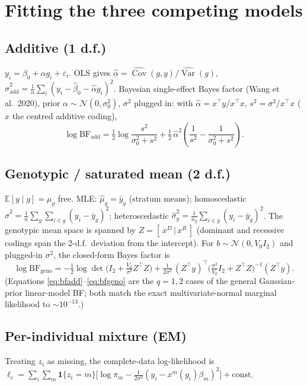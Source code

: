 \documentclass[11pt]{article}
\newcommand{\E}{\mathbb{E}}
\newcommand{\N}{\mathcal{N}}
\newcommand{\Var}{\operatorname{Var}}
\newcommand{\Cov}{\operatorname{Cov}}
\begin{document}
\section{Fitting the three competing models}

\subsection{Additive (1 d.f.)}
$y_i=\beta_0+\alpha g_i+\varepsilon_i$. OLS gives
$\hat\alpha=\widehat{\Cov}(g,y)/\widehat{\Var}(g)$,
$\hat\sigma^2_{\mathrm{add}}=\tfrac1n\sum_i(y_i-\hat\beta_0-\hat\alpha g_i)^2$.
Bayesian single-effect Bayes factor (Wang et al.\ 2020), prior
$\alpha\sim\N(0,\sigma_0^2)$, $\sigma^2$ plugged in: with $\hat\alpha=x^\top y/x^\top x$,
$s^2=\sigma^2/x^\top x$ ($x$ the centred additive coding),
\begin{equation}
\log\mathrm{BF}_{\mathrm{add}}
=\tfrac12\log\frac{s^2}{\sigma_0^2+s^2}
+\tfrac12\,\hat\alpha^2\!\left(\frac1{s^2}-\frac1{\sigma_0^2+s^2}\right).
\label{eq:bfadd}
\end{equation}

\subsection{Genotypic / saturated mean (2 d.f.)}
$\E[y\mid g]=\mu_g$ free. MLE: $\hat\mu_g=\bar y_g$ (stratum means);
homoscedastic $\hat\sigma^2=\tfrac1n\sum_g\sum_{i\in g}(y_i-\bar y_g)^2$;
heteroscedastic $\hat\sigma_g^2=\tfrac1{n_g}\sum_{i\in g}(y_i-\bar y_g)^2$.
The genotypic mean space is spanned by $Z=[\,x^D\,|\,x^R\,]$ (dominant and
recessive codings span the 2-d.f.\ deviation from the intercept). For
$b\sim\N(0,V_0 I_2)$ and plugged-in $\sigma^2$, the closed-form Bayes factor is
\begin{equation}
\log\mathrm{BF}_{\mathrm{geno}}
=-\tfrac12\log\det\!\Big(I_2+\tfrac{V_0}{\sigma^2}Z^\top Z\Big)
+\tfrac1{2\sigma^2}\,(Z^\top y)^\top\!\Big(\tfrac{\sigma^2}{V_0}I_2+Z^\top Z\Big)^{-1}\!(Z^\top y).
\label{eq:bfgeno}
\end{equation}
(Equations \eqref{eq:bfadd}--\eqref{eq:bfgeno} are the $q=1,2$ cases of the
general Gaussian-prior linear-model BF; both match the exact multivariate-normal
marginal likelihood to $\sim10^{-13}$.)

\subsection{Per-individual mixture (EM)}
Treating $z_i$ as missing, the complete-data log-likelihood is
$\ell_c=\sum_i\sum_m\mathbf 1\{z_i{=}m\}\big[\log\pi_m-\tfrac1{2\sigma^2}(y_i-x^m(g_i)\beta_m)^2\big]+\text{const}$.
\end{document}
